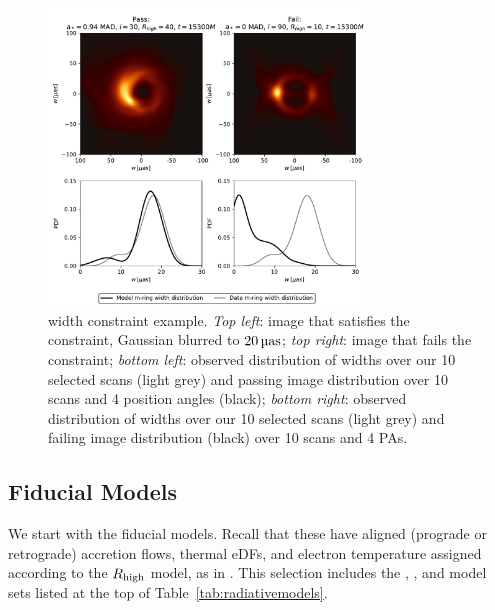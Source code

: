 \begin{figure}
  \centering
  \includegraphics[width=0.75\textwidth]{figures/mring_width_example.pdf}
  \caption{\Mring width constraint example.
    \emph{Top left}: image that satisfies the constraint, Gaussian blurred to $20\uas$;
    \emph{top right}: image that fails the constraint;
    \emph{bottom left}: observed distribution of \mring widths over our 10 selected scans (light grey) and passing image distribution over 10 scans and 4 position angles (black);
    \emph{bottom right}: observed distribution of \mring widths over our 10 selected scans (light grey) and failing image distribution (black) over 10 scans and 4 PAs.}
  \label{fig:mring_width_example}
\end{figure}


\subsection{Fiducial Models}\label{subsec:thermal}

We start with the fiducial models.
Recall that these have aligned (prograde or retrograde) accretion flows, thermal eDFs, and electron temperature assigned according to the $R_\mathrm{high}$ model, as in .
This selection includes the \kharma, \bhac, and \hamr model sets listed at the top of Table~\ref{tab:radiativemodels}.

